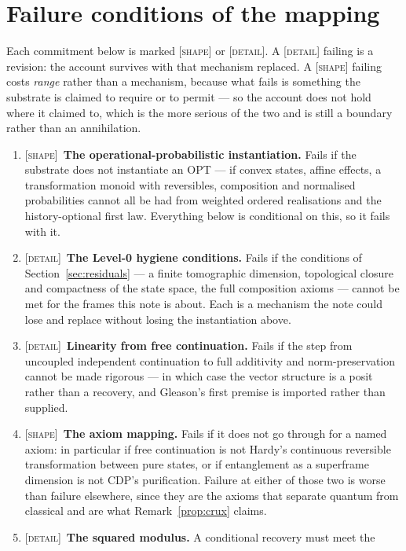 \documentclass[11pt,a4paper]{article}
\theoremstyle{remark}\newtheorem{remark}[definition]{Remark}
\begin{document}
\section{Failure conditions of the mapping}\label{sec:falsifiability}
Each commitment below is marked \textsc{[shape]} or \textsc{[detail]}. A
\textsc{[detail]} failing is a revision: the account survives with that mechanism
replaced. A \textsc{[shape]} failing costs \emph{range} rather than a mechanism,
because what fails is something the substrate is claimed to require or to permit
--- so the account does not hold where it claimed to, which is the more serious of
the two and is still a boundary rather than an annihilation.

\begin{enumerate}[leftmargin=*]
\item \textsc{[shape]}~\textbf{The operational-probabilistic instantiation.} Fails
if the substrate does not instantiate an OPT --- if convex states, affine effects,
a transformation monoid with reversibles, composition and normalised probabilities
cannot all be had from weighted ordered realisations and the history-optional first
law. Everything below is conditional on this, so it fails with it.
\item \textsc{[detail]}~\textbf{The Level-0 hygiene conditions.} Fails if the
conditions of Section~\ref{sec:residuals} --- a finite tomographic dimension,
topological closure and compactness of the state space, the full composition axioms
--- cannot be met for the frames this note is about. Each is a mechanism the note
could lose and replace without losing the instantiation above.
\item \textsc{[detail]}~\textbf{Linearity from free continuation.} Fails if the
step from uncoupled independent continuation to full additivity and
norm-preservation cannot be made rigorous --- in which case the vector structure is
a posit rather than a recovery, and Gleason's first premise is imported rather than
supplied.
\item \textsc{[shape]}~\textbf{The axiom mapping.} Fails if it does not go through
for a named axiom: in particular if free continuation is not Hardy's continuous
reversible transformation between pure states, or if entanglement as a superframe
dimension is not CDP's purification. Failure at either of those two is worse than
failure elsewhere, since they are the axioms that separate quantum from classical
and are what Remark~\ref{prop:crux} claims.
\item \textsc{[detail]}~\textbf{The squared modulus.} A conditional recovery must meet the

\end{enumerate}
\end{document}
